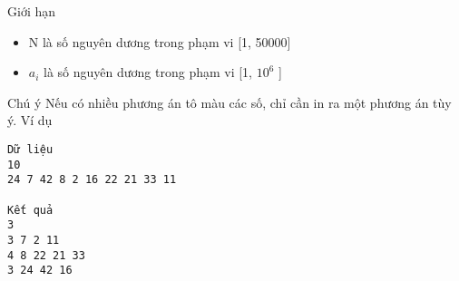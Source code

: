 Giới hạn
\begin{itemize}
	\item     N là số nguyên dương trong phạm vi [1, 50000]   
	\item     $a_{i}$    là số nguyên dương trong phạm vi [1, $10^{6}$    ]   
\end{itemize}
Chú ý
Nếu có nhiều phương án tô màu các số, chỉ cần in ra một phương án tùy ý.
Ví dụ
\begin{verbatim}
Dữ liệu
10
24 7 42 8 2 16 22 21 33 11	

Kết quả
3
3 7 2 11 
4 8 22 21 33 
3 24 42 16
\end{verbatim}